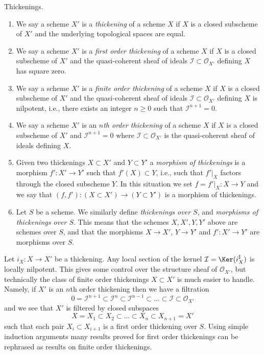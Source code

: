 \begin{definition}
\label{definition-thickening}
Thickenings.
\begin{enumerate}
\item We say a scheme $X'$ is a {\it thickening} of a scheme $X$ if
$X$ is a closed subscheme of $X'$ and the underlying topological spaces
are equal.
\item We say a scheme $X'$ is a {\it first order thickening} of a scheme $X$ if
$X$ is a closed subscheme of $X'$ and the quasi-coherent sheaf of ideals
$\mathcal{I} \subset \mathcal{O}_{X'}$ defining $X$ has square zero.
\item We say a scheme $X'$ is a {\it finite order thickening} of a scheme $X$
if $X$ is a closed subscheme of $X'$ and the quasi-coherent sheaf of ideals
$\mathcal{I} \subset \mathcal{O}_{X'}$ defining $X$ is nilpotent, i.e.,
there exists an integer $n \geq 0$ such that $\mathcal{I}^{n + 1} = 0$.
\item We say a scheme $X'$ is an {\it $n$th order thickening} of a scheme $X$
if $X$ is a closed subscheme of $X'$ and $\mathcal{I}^{n + 1} = 0$
where $\mathcal{I} \subset \mathcal{O}_{X'}$ is the
quasi-coherent sheaf of ideals defining $X$.
\item Given two thickenings $X \subset X'$ and $Y \subset Y'$ a
{\it morphism of thickenings} is a morphism $f' : X' \to Y'$ such that
$f'(X) \subset Y$, i.e., such that $f'|_X$ factors through the closed
subscheme $Y$. In this situation we set $f = f'|_X : X \to Y$ and we say
that $(f, f') : (X \subset X') \to (Y \subset Y')$ is a morphism of
thickenings.
\item Let $S$ be a scheme. We similarly define {\it thickenings over $S$}, and
{\it morphisms of thickenings over $S$}. This means that the schemes
$X, X', Y, Y'$ above are schemes over $S$, and that the morphisms
$X \to X'$, $Y \to Y'$ and $f' : X' \to Y'$ are morphisms over $S$.
\end{enumerate}
\end{definition}

\noindent
Let $i_X : X \to X'$ be a thickening. Any local section of the kernel
$\mathcal{I} = \Ker(i_X^\sharp)$ is locally nilpotent. This gives
some control over the structure sheaf of $\mathcal{O}_{X'}$, but
technically the class of finite order thickenings $X \subset X'$
is much easier to handle. Namely, if $X'$ is an $n$th order thickening
then we have a filtration
$$
0 = \mathcal{I}^{n + 1} \subset
\mathcal{I}^n \subset
\mathcal{I}^{n - 1} \subset \ldots \subset
\mathcal{I} \subset \mathcal{O}_{X'}
$$
and we see that $X'$ is filtered by closed subspaces
$$
X = X_1 \subset X_2 \subset \ldots \subset X_n \subset X_{n + 1} = X'
$$
such that each pair $X_i \subset X_{i + 1}$ is a first order thickening
over $S$. Using simple induction arguments many results proved for first order
thickenings can be rephrased as results on finite order thickenings.

